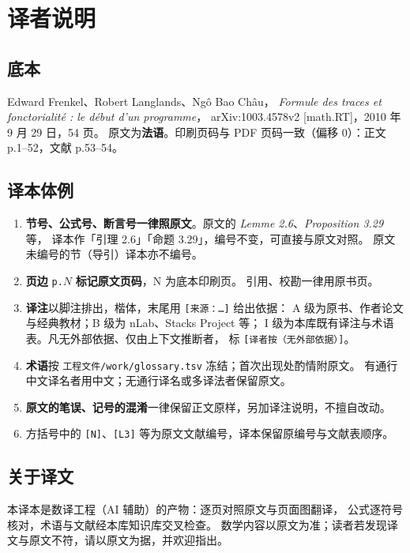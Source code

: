 \chapter*{译者说明}

\section*{底本}

Edward Frenkel、Robert Langlands、Ngô Bao Châu，
\emph{Formule des traces et fonctorialité : le début d'un programme}，
arXiv:1003.4578v2 [math.RT]，2010 年 9 月 29 日，54 页。
原文为\textbf{法语}。印刷页码与 PDF 页码一致（偏移 0）：正文 p.1--52，文献 p.53--54。

\section*{译本体例}

\begin{enumerate}[leftmargin=2em,itemsep=0.2em]
  \item \textbf{节号、公式号、断言号一律照原文}。原文的 \emph{Lemme 2.6}、\emph{Proposition 3.29} 等，
        译本作「引理 2.6」「命题 3.29」，编号不变，可直接与原文对照。
        原文未编号的节（导引）译本亦不编号。
  \item \textbf{页边 } \texttt{p.$N$} \textbf{ 标记原文页码}，N 为底本印刷页。
        引用、校勘一律用原书页。
  \item \textbf{译注}以脚注排出，楷体，末尾用 \texttt{[来源：…]} 给出依据：
        A 级为原书、作者论文与经典教材；B 级为 nLab、Stacks Project 等；
        I 级为本库既有译注与术语表。凡无外部依据、仅由上下文推断者，
        标 \texttt{[译者按（无外部依据）]}。
  \item \textbf{术语}按 \texttt{工程文件/work/glossary.tsv} 冻结；首次出现处酌情附原文。
        有通行中文译名者用中文；无通行译名或多译法者保留原文。
  \item \textbf{原文的笔误、记号的混淆}一律保留正文原样，另加译注说明，不擅自改动。
  \item 方括号中的 \texttt{[N]}、\texttt{[L3]} 等为原文文献编号，译本保留原编号与文献表顺序。
\end{enumerate}

\section*{关于译文}

本译本是数译工程（AI 辅助）的产物：逐页对照原文与页面图翻译，
公式逐符号核对，术语与文献经本库知识库交叉检查。
数学内容以原文为准；读者若发现译文与原文不符，请以原文为据，并欢迎指出。
